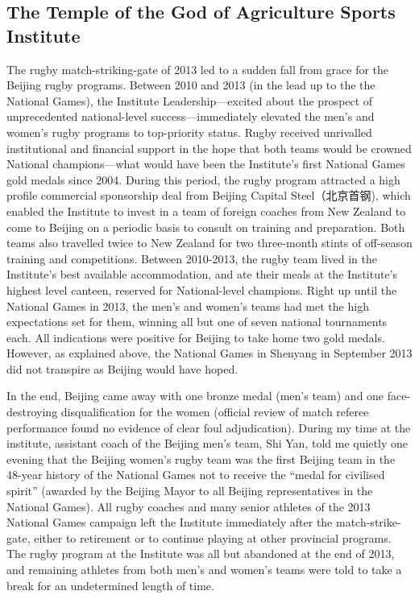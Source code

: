 \begin{CJK}{UTF8}{gbsn}
 \subsection{The Temple of the God of Agriculture Sports Institute}
 The rugby match-striking-gate of 2013 led to a sudden fall from grace for the Beijing rugby programs.  Between 2010 and 2013 (in the lead up to the the National Games), the Institute Leadership---excited about the prospect of unprecedented national-level success---immediately elevated the men's and women's rugby programs to top-priority status.  Rugby received unrivalled institutional and financial support in the hope that both teams would be crowned National champions---what would have been the Institute's first National Games gold medals since 2004.  During this period, the rugby program attracted a high profile commercial sponsorship deal from Beijing Capital Steel（北京首钢), which enabled the Institute to invest in a team of foreign coaches from New Zealand to come to Beijing on a periodic basis to consult on training and preparation. Both teams also travelled twice to New Zealand for two three-month stints of off-season training and competitions.  Between 2010-2013, the rugby team lived in the Institute's best available accommodation, and ate their meals at the Institute's highest level canteen, reserved for National-level champions.  Right up until the National Games in 2013, the men's and women's teams had met the high expectations set for them, winning all but one of seven national tournaments each.  All indications were positive for Beijing to take home two gold medals.  However, as explained above, the National Games in Shenyang in September 2013 did not transpire as Beijing would have hoped.

 In the end, Beijing came away with one bronze medal (men's team) and one face-destroying disqualification for the women (official review of match referee performance found no evidence of clear foul adjudication).  During my time at the institute, assistant coach of the Beijing men's team, Shi Yan, told me quietly one evening that the Beijing women's rugby team was the first Beijing team in the 48-year history of the National Games not to receive the ``medal for civilised spirit''  (awarded by the Beijing Mayor to all Beijing representatives in the National Games).  All rugby coaches and many senior athletes of the 2013 National Games campaign left the Institute immediately after the match-strike-gate, either to retirement or to continue playing at other provincial programs.  The rugby program at the Institute was all but abandoned at the end of 2013, and remaining athletes from both men's and women's teams were told to take a break for an undetermined length of time.


\end{CJK}
